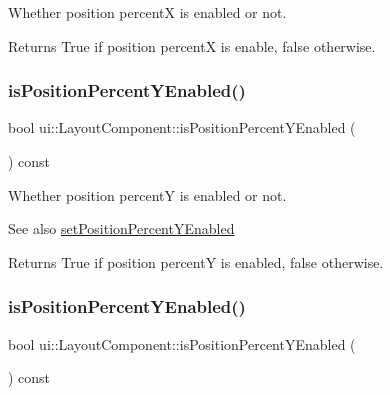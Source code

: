 Whether position percentX is enabled or not. \begin{DoxyReturn}{Returns}
True if position percentX is enable, false otherwise. 
\end{DoxyReturn}
\mbox{\label{classui_1_1LayoutComponent_afdcda91cca2879a420c406c785c58284}} 
\subsubsection{\texorpdfstring{is\+Position\+Percent\+Y\+Enabled()}{isPositionPercentYEnabled()}\hspace{0.1cm}{\footnotesize\ttfamily [1/2]}}
{\footnotesize\ttfamily bool ui\+::\+Layout\+Component\+::is\+Position\+Percent\+Y\+Enabled (\begin{DoxyParamCaption}{ }\end{DoxyParamCaption}) const}

Whether position percentY is enabled or not. \begin{DoxySeeAlso}{See also}
{\ttfamily \hyperlink{classui_1_1LayoutComponent_a820438ea0ef37dd3570ef21d9a3392ab}{set\+Position\+Percent\+Y\+Enabled}} 
\end{DoxySeeAlso}
\begin{DoxyReturn}{Returns}
True if position percentY is enabled, false otherwise. 
\end{DoxyReturn}
\mbox{\label{classui_1_1LayoutComponent_afdcda91cca2879a420c406c785c58284}} 
\subsubsection{\texorpdfstring{is\+Position\+Percent\+Y\+Enabled()}{isPositionPercentYEnabled()}\hspace{0.1cm}{\footnotesize\ttfamily [2/2]}}
{\footnotesize\ttfamily bool ui\+::\+Layout\+Component\+::is\+Position\+Percent\+Y\+Enabled (\begin{DoxyParamCaption}{ }\end{DoxyParamCaption}) const}

